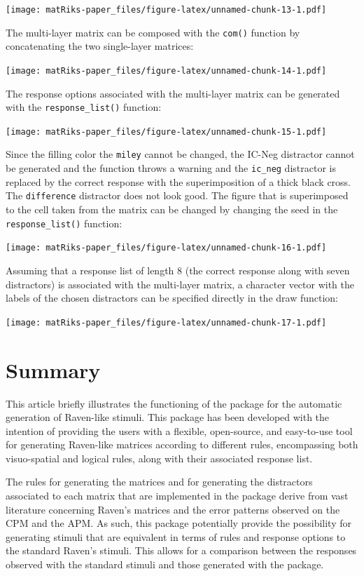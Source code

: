 \texttt{[image: matRiks-paper\_files/figure-latex/unnamed-chunk-13-1.pdf]}

The multi-layer matrix can be composed with the \texttt{com()} function by concatenating the two single-layer matrices:

\texttt{[image: matRiks-paper\_files/figure-latex/unnamed-chunk-14-1.pdf]}

The response options associated with the multi-layer matrix can be generated with the \texttt{response\_list()} function:

\texttt{[image: matRiks-paper\_files/figure-latex/unnamed-chunk-15-1.pdf]}

Since the filling color the \texttt{miley} cannot be changed, the IC-Neg distractor cannot be generated and the function throws a warning and the \texttt{ic\_neg} distractor is replaced by the correct response with the superimposition of a thick black cross.
The \texttt{difference} distractor does not look good.
The figure that is superimposed to the cell taken from the matrix can be changed by changing the seed in the \texttt{response\_list()} function:

\texttt{[image: matRiks-paper\_files/figure-latex/unnamed-chunk-16-1.pdf]}

Assuming that a response list of length 8 (the correct response along with seven distractors) is associated with the multi-layer matrix, a character vector with the labels of the chosen distractors can be specified directly in the draw function:

\texttt{[image: matRiks-paper\_files/figure-latex/unnamed-chunk-17-1.pdf]}

\section{Summary}\label{summary}

This article briefly illustrates the functioning of the  package for the automatic generation of Raven-like stimuli.
This package has been developed with the intention of providing the users with a flexible, open-source, and easy-to-use tool for generating Raven-like matrices according to different rules, encompassing both visuo-spatial and logical rules, along with their associated response list.

The rules for generating the matrices and for generating the distractors associated to each matrix that are implemented in the  package derive from vast literature concerning Raven's matrices and the error patterns observed on the CPM and the APM.
As such, this package potentially provide the possibility for generating stimuli that are equivalent in terms of rules and response options to the standard Raven's stimuli.
This allows for a comparison between the responses observed with the standard stimuli and those generated with the package.

